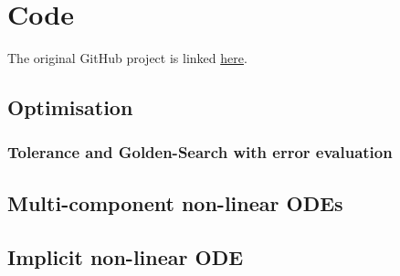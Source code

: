 \documentclass[../main.tex]{subfiles}
\begin{document}
    \section{Code}\label{sec:code}

    The original GitHub project is linked \href{https://github.com/TheSilverLeopard/University/tree/projects/MTH2005%20Modelling%20-%20Theory%20and%20Practice/Coursework%202}{here}.

    \subsection*{Optimisation}\label{subsec:optimisation-appendix}
    \subsubsection{Tolerance and Golden-Search with error evaluation}\label{subsubsec:tolerance-golden-appendix}

    

    \newpage
    \subsection*{Multi-component non-linear ODEs}\label{subsec:multi-component-non-linear-odes-appendix}

    

    \newpage
    \subsection*{Implicit non-linear ODE}\label{subsec:implicit-non-linear-ode-appendix}

    

    \newpage
    
\end{document}
